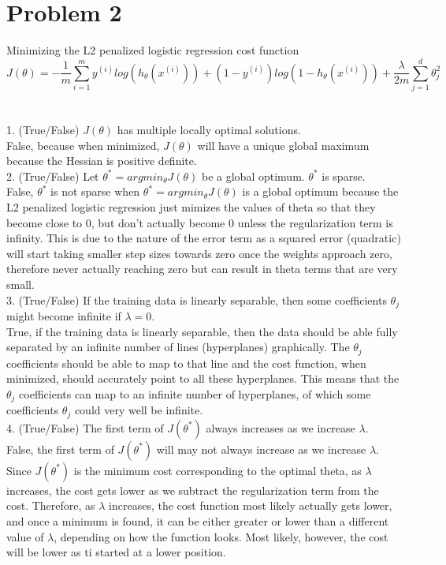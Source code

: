 \documentclass[12pt]{article}
\begin{document}
\section*{Problem 2}
Minimizing the L2 penalized logistic regression cost function
$$J(\theta) = - \frac{1}{m}\sum_{i=1}^my^{(i)}log(h_\theta(x^{(i)})) + (1 - y^{(i)})log(1-h_\theta(x^{(i)})) + \frac{\lambda}{2m}\sum_{j=1}^d\theta_j^2$$\\
\\
1. (True/False) $J(\theta)$ has multiple locally optimal solutions.\\
False, because when minimized, $J(\theta)$ will have a unique global maximum because the Hessian is positive definite.\\

2. (True/False) Let $\theta^* = argmin_\theta J(\theta)$ be a global optimum. $\theta^*$ is sparse.\\
False, $\theta^*$ is not sparse when $\theta^* = argmin_\theta J(\theta)$ is a global optimum because the L2 penalized logistic regression just mimizes the values of theta so that they become close to 0, but don't actually become 0 unless the regularization term is infinity. This is due to the nature of the error term as a squared error (quadratic) will start taking smaller step sizes towards zero once the weights approach zero, therefore never actually reaching zero but can result in theta terms that are very small. \\

3. (True/False) If the training data is linearly separable, then some coefficients $\theta_j$ might become infinite if $\lambda = 0$.\\
True, if the training data is linearly separable, then the data should be able fully separated by an infinite number of lines (hyperplanes) graphically. The $\theta_j$ coefficients should be able to map to that line and the cost function, when minimized, should accurately point to all these hyperplanes. This means that the $\theta_j$  coefficients can map to an infinite number of hyperplanes, of which some coefficients $\theta_j$ could very well be infinite.\\

4. (True/False) The first term of $J(\theta^*)$ always increases as we increase $\lambda$.\\
False, the first term of $J(\theta^*)$ will may not always increase as we increase $\lambda$.  Since $J(\theta^*)$ is the minimum cost corresponding to the optimal theta, as $\lambda$ increases, the cost gets lower as we subtract the regularization term from the cost. Therefore, as $\lambda$ increases, the cost function most likely actually gets lower, and once a minimum is found, it can be either greater or lower than a different value of $\lambda$, depending on how the function looks. Most likely, however, the cost will be lower as ti started at a lower position.\\
\end{document}
